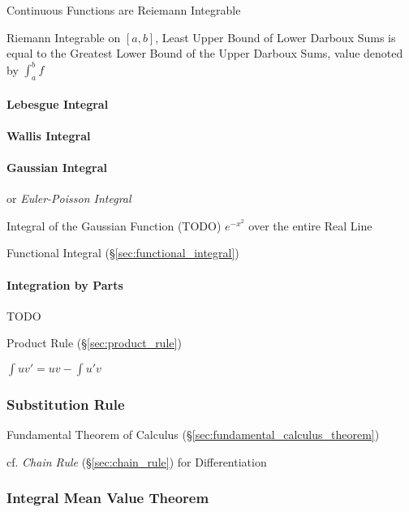 Continuous Functions are Reiemann Integrable

Riemann Integrable on $[a,b]$, Least Upper Bound of Lower Darboux Sums
is equal to the Greatest Lower Bound of the Upper Darboux Sums, value
denoted by $\int_a^b f$



\paragraph{Lebesgue Integral}\label{sec:lebesgue_integral}\hfill

\paragraph{Wallis Integral}\label{sec:wallis_integral}\hfill

\paragraph{Gaussian Integral}\label{sec:gaussian_integral}\hfill

or \emph{Euler-Poisson Integral}

Integral of the Gaussian Function (TODO) $e^{-x^2}$ over the entire Real Line

\fist Functional Integral (\S\ref{sec:functional_integral})



\paragraph{Integration by Parts}\label{sec:integration_by_parts}\hfill

TODO

\fist Product Rule (\S\ref{sec:product_rule})

$\int{uv'} = uv - \int{u'v}$



\subsubsection{Substitution Rule}\label{sec:substitution_rule}

Fundamental Theorem of Calculus (\S\ref{sec:fundamental_calculus_theorem})

\fist cf. \emph{Chain Rule} (\S\ref{sec:chain_rule}) for Differentiation



\subsubsection{Integral Mean Value Theorem}
\label{sec:integral_mean_value}

